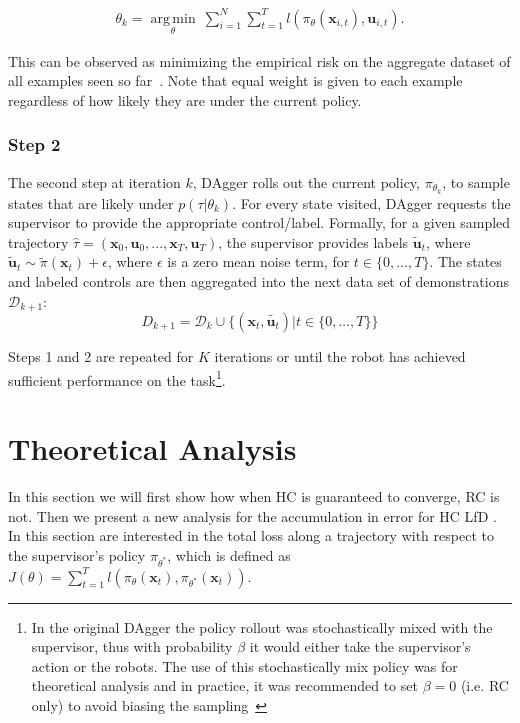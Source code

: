 \documentclass[10pt, conference]{ieeeconf}      %
\DeclareMathOperator*{\argmin}{arg\,min}
\newcommand{\bu}{\mathbf{u}}
\newcommand{\bx}{\mathbf{x}}
\newcommand{\ns}{HC LfD }
\begin{document}
 \vspace{-1ex}
\begin{align}\label{eq:super_objj}
\theta_{k} = \underset{\theta}{\argmin} \: \sum_{i=1}^{N} \sum_{t=1}^T  l(\pi_{\theta}(\bx_{i,t}),\bu_{i,t}).
\end{align}

This can be observed as minimizing the empirical risk on the aggregate dataset of all examples seen so far~\cite{scholkopf2002learning}.  Note that equal weight is given to each example regardless of how likely they are under the current policy.
 

 \subsubsection{Step 2}
The second step at iteration $k$, DAgger rolls out the current policy, $\pi_{\theta_{k}}$, to sample states that are likely under $p(\tau|\theta_{k})$.  For every state visited, DAgger requests the supervisor to provide the appropriate control/label. Formally, for a given sampled trajectory  $\hat{\tau} = (\bx_0,\bu_0,...,\bx_T,\bu_T )$, the supervisor provides labels $\tilde{\bu}_t$, where $\tilde{\bu}_t \sim \tilde{\pi}(\bx_t) + \epsilon$, where $\epsilon$ is a  zero mean noise term, for $t\in \{0, \ldots, T\}$.
The states and labeled controls are then aggregated into the next data set of demonstrations $\mathcal{D}_{k+1}$:
$$D_{k+1}=\mathcal{D}_k \cup \{(\bx_t,\tilde{\bu_t})|t\in\{0,\ldots,T\}\} $$

Steps 1 and 2 are repeated for $K$ iterations or until the robot has achieved sufficient performance on the
task\footnote{In the original DAgger the policy rollout was stochastically mixed with the supervisor, thus with
    probability $\beta$ it would either take the supervisor's action or the robots. The use of this stochastically mix
    policy was for theoretical analysis and in practice, it was recommended to set $\beta = 0$ (i.e. RC only) to avoid biasing the
sampling~\cite{NIPS2014_5421,ross2010reduction}}.


 

\section{Theoretical Analysis}
In this section we will first show how when HC is guaranteed to converge, RC is not.  Then we present a new analysis for the accumulation in error for  \ns. In this section are interested in the total loss along a trajectory with respect to the supervisor's policy $\pi_{\theta^*}$, which is defined as $J(\theta) = \sum^T_{t=1} l(\pi_{\theta}(\bx_{t}),\pi_{\theta^*}(\bx_{t}))$. 
\end{document}
